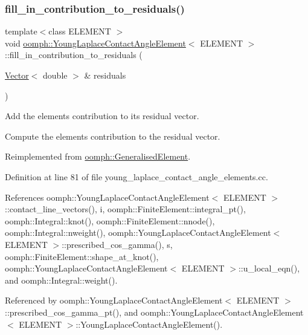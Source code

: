 \subsubsection{\texorpdfstring{fill\+\_\+in\+\_\+contribution\+\_\+to\+\_\+residuals()}{fill\_in\_contribution\_to\_residuals()}}
{\footnotesize\ttfamily template$<$class E\+L\+E\+M\+E\+NT $>$ \\
void \hyperlink{classoomph_1_1YoungLaplaceContactAngleElement}{oomph\+::\+Young\+Laplace\+Contact\+Angle\+Element}$<$ E\+L\+E\+M\+E\+NT $>$\+::fill\+\_\+in\+\_\+contribution\+\_\+to\+\_\+residuals (\begin{DoxyParamCaption}\item[{\hyperlink{classoomph_1_1Vector}{Vector}$<$ double $>$ \&}]{residuals }\end{DoxyParamCaption})\hspace{0.3cm}{\ttfamily [virtual]}}



Add the element\textquotesingle{}s contribution to its residual vector. 

Compute the element\textquotesingle{}s contribution to the residual vector. 

Reimplemented from \hyperlink{classoomph_1_1GeneralisedElement_a310c97f515e8504a48179c0e72c550d7}{oomph\+::\+Generalised\+Element}.



Definition at line 81 of file young\+\_\+laplace\+\_\+contact\+\_\+angle\+\_\+elements.\+cc.



References oomph\+::\+Young\+Laplace\+Contact\+Angle\+Element$<$ E\+L\+E\+M\+E\+N\+T $>$\+::contact\+\_\+line\+\_\+vectors(), i, oomph\+::\+Finite\+Element\+::integral\+\_\+pt(), oomph\+::\+Integral\+::knot(), oomph\+::\+Finite\+Element\+::nnode(), oomph\+::\+Integral\+::nweight(), oomph\+::\+Young\+Laplace\+Contact\+Angle\+Element$<$ E\+L\+E\+M\+E\+N\+T $>$\+::prescribed\+\_\+cos\+\_\+gamma(), s, oomph\+::\+Finite\+Element\+::shape\+\_\+at\+\_\+knot(), oomph\+::\+Young\+Laplace\+Contact\+Angle\+Element$<$ E\+L\+E\+M\+E\+N\+T $>$\+::u\+\_\+local\+\_\+eqn(), and oomph\+::\+Integral\+::weight().



Referenced by oomph\+::\+Young\+Laplace\+Contact\+Angle\+Element$<$ E\+L\+E\+M\+E\+N\+T $>$\+::prescribed\+\_\+cos\+\_\+gamma\+\_\+pt(), and oomph\+::\+Young\+Laplace\+Contact\+Angle\+Element$<$ E\+L\+E\+M\+E\+N\+T $>$\+::\+Young\+Laplace\+Contact\+Angle\+Element().

